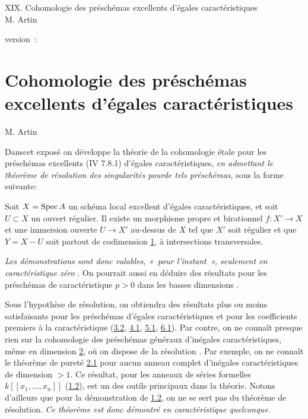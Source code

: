 \documentclass[10pt]{../fichiers-configuration-latex/smfart}
\begin{document}
\begin{center}
XIX. Cohomologie des préschémas excellents d'égales caractéristiques\\
M. Artin 
\end{center}

version : \showgitstatus{}
\tableofcontents

\else
\chapter{Cohomologie des préschémas excellents d'égales caractéristiques}
\begin{center}
M. Artin 
\end{center}
\fi

\newcommand{\UU}{\mathbf{U}}

Dans\pageoriginale cet exposé on développe la théorie de la
cohomologie étale pour 
les préschémas excellents (\EGA IV 7.8.1) d'égales caractéristiques,
\emph{en admettant le théorème de résolution des singularités
  pour\pageoriginale de tels préschémas}, sous la forme suivante:

Soit $X=\operatorname{Spec} A$ un schéma local excellent d'égales caractéristiques,
et soit $U\subset X$ un ouvert régulier. Il existe un morphisme propre
et birationnel $f:X'\rightarrow X$ et une immersion ouverte
$U\rightarrow X'$ au-dessus de $X$ tel que $X'$ soit régulier et que
$Y=X-U$ soit partout de codimension \hyperref[XIX.sec1]{1}, 
à intersections transversales.

\emph{Les démonstrations sont donc valables, « pour l'instant »,
  seulement en caractéristique zéro} \cite{SGA4-19:4}. On pourrait aussi en déduire
  des résultats pour les préschémas de caractéristique $p>0$ dans les
  basses dimensions \cite{SGA4-19:1}.

Sous l'hypothèse de résolution, on obtiendra des résultats plus ou
moins satisfaisants pour les préschémas d'égales caractéristiques et
pour les coefficients premiers à la caractéristique (\cf \hyperref[XIX.thm3.2]{3.2}, \hyperref[XIX.thm4.1]{4.1},
\hyperref[XIX.thm5.1]{5.1}, \hyperref[XIX.thm6.1]{6.1}). Par contre, on ne connaît presque rien sur la cohomologie
des préschémas généraux d'inégales caractéristiques, même en dimension
\hyperref[XIX.sec2]{2}, où on dispose de la résolution \cite{SGA4-19:2}. Par exemple, on ne connaît le
théorème de pureté \hyperref[XIX.thm2.1]{2.1} pour aucun anneau complet d'inégales
caractéristiques de dimension $>1$. Ce résultat, pour les anneaux de
séries formelles $k[[x_{1},\ldots, x_{n}]]$ (\hyperref[XIX.thm1.2]{1.2}), est un des outils
principaux dans la théorie. Notons d'ailleurs que pour la
démonstration de \hyperref[XIX.thm1.2]{1.2}, on ne se sert pas du théorème de
résolution. \emph{Ce théorème est donc démontré en caractéristique
  quelconque.}
\end{document}
